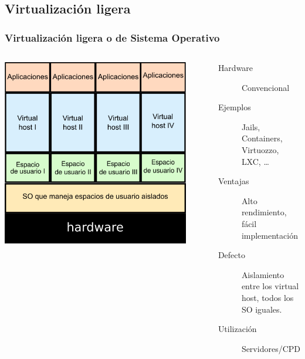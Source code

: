 \documentclass{beamer}
\begin{document}
\subsection{Virtualización ligera}
\begin{frame} \frametitle{Virtualización ligera o de Sistema Operativo}
  \begin{columns}
    \begin{center}
    \includegraphics[width=0.9\textwidth]{img/virt_ligera.png}      
    \end{center}
    \begin{description}
    \item[Hardware] Convencional
    \item[Ejemplos] Jails, Containers, Virtuozzo, LXC, \ldots
    \item [Ventajas] Alto rendimiento, fácil implementación
    \item[Defecto] Aislamiento entre los virtual host, todos los SO iguales.
    \item[Utilización] Servidores/CPD
    \end{description}
  \end{columns}
\end{frame}
\end{document}
